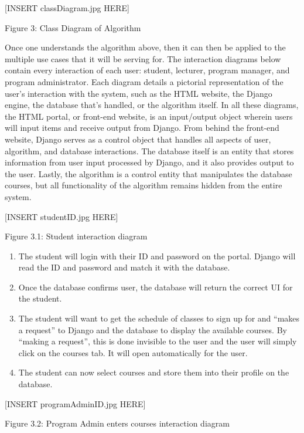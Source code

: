 \documentclass[12pt,article]{memoir}
\begin{document}
 [INSERT classDiagram.jpg HERE]

Figure 3: Class Diagram of Algorithm

Once one understands the algorithm above, then it can then be applied to the multiple use cases that it will be serving for. The interaction diagrams below contain every interaction of each user: student, lecturer, program manager, and program administrator. Each diagram details a pictorial representation of the user’s interaction with the system, such as the HTML website, the Django engine, the database that’s handled, or the algorithm itself.  In all these diagrams, the HTML portal, or front-end website, is an input/output object wherein users will input items and receive output from Django. From behind the front-end website, Django serves as a control object that handles all aspects of user, algorithm, and database interactions. The database itself is an entity that stores information from user input processed by Django, and it also provides output to the user. Lastly, the algorithm is a control entity that manipulates the database courses, but all functionality of the algorithm remains hidden from the entire system. 

[INSERT studentID.jpg HERE]

Figure 3.1: Student interaction diagram

\begin{enumerate}
\item The student will login with their ID and password on the portal. Django will read the ID and password and match it with the database. 
\item Once the database confirms user, the database will return the correct UI for the student.
\item The student will want to get the schedule of classes to sign up for and “makes a request” to Django and the database to display the available courses. By “making a request”, this is done invisible to the user and the user will simply click on the courses tab. It will open automatically for the user. 
\item The student can now select courses and store them into their profile on the database. 
\end{enumerate}

[INSERT programAdminID.jpg HERE]

 Figure 3.2: Program Admin enters courses interaction diagram
\end{document}
